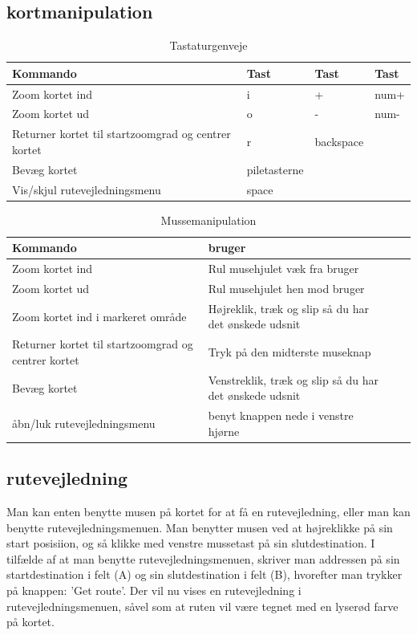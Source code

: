 \subsection{kortmanipulation}
\begin{table}[h!t]
\centering
	\caption{Tastaturgenveje}
	\begin{tabular}{p{6cm} l l l}
		\hline\hline
		Kommando & Tast & Tast & Tast \\ [0.5ex]
		\hline
		Zoom kortet ind & i & + & num+\\
		Zoom kortet ud & o & - & num-\\
		Returner kortet til startzoomgrad og centrer kortet & r & backspace\\
		Bevæg kortet & piletasterne\\
		Vis/skjul rutevejledningsmenu & space \\
		\hline
	\end{tabular}
\end{table}

\begin{table}[h!t]
\centering
	\caption{Mussemanipulation}
	\begin{tabular}{p{3cm} l l p{5cm}}
		\hline\hline
		Kommando & bruger \\ [0.5ex]
		\hline
		Zoom kortet ind & Rul musehjulet væk fra bruger\\
		Zoom kortet ud & Rul musehjulet hen mod bruger\\
		Zoom kortet ind i markeret område & Højreklik, træk og slip så du har det ønskede udsnit\\
		Returner kortet til startzoomgrad og centrer kortet & Tryk på den midterste museknap\\
		Bevæg kortet & Venstreklik, træk og slip så du har det ønskede udsnit\\
		åbn/luk rutevejledningsmenu & benyt knappen nede i venstre hjørne\\
		\hline
	\end{tabular}
\end{table}

\subsection{rutevejledning}

Man kan enten  benytte musen på kortet for at få en rutevejledning, eller man kan benytte rutevejledningsmenuen. Man benytter musen ved at højreklikke på sin start posisiion, og så klikke med venstre mussetast på sin slutdestination. I tilfælde af at man benytte rutevejledningsmenuen, skriver man addressen på sin startdestination i felt (A) og sin slutdestination i felt (B), hvorefter man trykker på knappen: 'Get route'. Der vil nu vises en rutevejledning i rutevejledningsmenuen, såvel som at ruten vil være tegnet med en lyserød farve på kortet.

